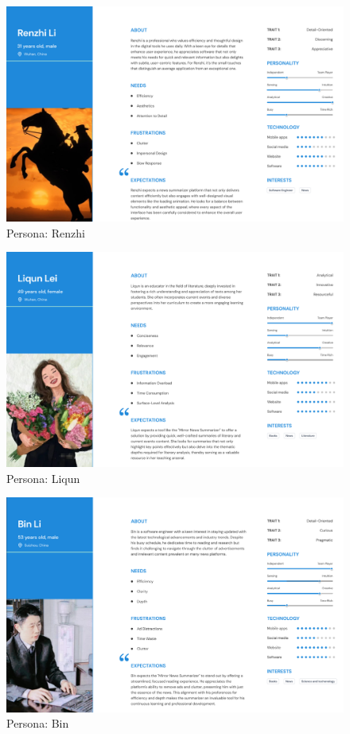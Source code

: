\documentclass[10pt]{article}
\begin{document}
\begin{figure}[H]
    \centering
    \includegraphics[width=\textwidth]{../persona renzhi.png}
    \caption{Persona: Renzhi}
    \label{fig:persona-renzhi}
\end{figure}

\begin{figure}[H]
    \centering
    \includegraphics[width=\textwidth]{../persona liqun.png}
    \caption{Persona: Liqun}
    \label{fig:persona-liqun}
\end{figure}

\begin{figure}[H]
    \centering
    \includegraphics[width=\textwidth]{../persona bin.png}
    \caption{Persona: Bin}
    \label{fig:persona-bin}
\end{figure}
\end{document}
